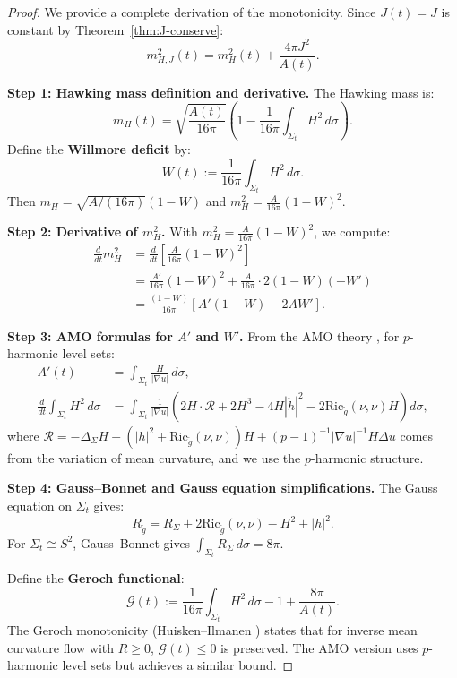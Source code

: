 \documentclass[12pt]{article}
\theoremstyle{plain}
\theoremstyle{definition}
\theoremstyle{remark}
\newcommand{\Ric}{\mathrm{Ric}}
\newcommand{\tg}{\tilde{g}}
\begin{document}
\begin{proof}
We provide a complete derivation of the monotonicity. Since $J(t) = J$ is constant by Theorem~\ref{thm:J-conserve}:
\[
m_{H,J}^2(t) = m_H^2(t) + \frac{4\pi J^2}{A(t)}.
\]

\textbf{Step 1: Hawking mass definition and derivative.}
The Hawking mass is:
\[
m_H(t) = \sqrt{\frac{A(t)}{16\pi}}\left(1 - \frac{1}{16\pi}\int_{\Sigma_t} H^2 \, d\sigma\right).
\]
Define the \textbf{Willmore deficit} by:
\[ W(t) := \frac{1}{16\pi}\int_{\Sigma_t} H^2 \, d\sigma. \]
Then $m_H = \sqrt{A/(16\pi)}(1-W)$ and $m_H^2 = \frac{A}{16\pi}(1 - W)^2$.

\textbf{Step 2: Derivative of $m_H^2$.}
With $m_H^2 = \frac{A}{16\pi}(1-W)^2$, we compute:
\begin{align}
\frac{d}{dt}m_H^2 &= \frac{d}{dt}\left[\frac{A}{16\pi}(1 - W)^2\right] \\
&= \frac{A'}{16\pi}(1 - W)^2 + \frac{A}{16\pi} \cdot 2(1-W)(-W') \\
&= \frac{(1-W)}{16\pi}\left[A'(1 - W) - 2AW'\right].
\end{align}

\textbf{Step 3: AMO formulas for $A'$ and $W'$.}
From the AMO theory \cite[Theorem 3.1]{amo2022}, for $p$-harmonic level sets:
\begin{align}
A'(t) &= \int_{\Sigma_t} \frac{H}{|\nabla u|} \, d\sigma, \label{eq:A-prime}\\
\frac{d}{dt}\int_{\Sigma_t} H^2 \, d\sigma &= \int_{\Sigma_t} \frac{1}{|\nabla u|}\left(2H \cdot \mathcal{R} + 2H^3 - 4H|\mathring{h}|^2 - 2\Ric_{\tg}(\nu,\nu)H\right) d\sigma, \label{eq:H2-prime}
\end{align}
where $\mathcal{R} = -\Delta_\Sigma H - (|h|^2 + \Ric_{\tg}(\nu,\nu))H + (p-1)^{-1}|\nabla u|^{-1}H\Delta u$ comes from the variation of mean curvature, and we use the $p$-harmonic structure.

\textbf{Step 4: Gauss--Bonnet and Gauss equation simplifications.}
The Gauss equation on $\Sigma_t$ gives:
\[
R_{\tg} = R_{\Sigma} + 2\Ric_{\tg}(\nu,\nu) - H^2 + |h|^2.
\]
For $\Sigma_t \cong S^2$, Gauss--Bonnet gives $\int_{\Sigma_t} R_\Sigma \, d\sigma = 8\pi$.

Define the \textbf{Geroch functional}:
\[
\mathcal{G}(t) := \frac{1}{16\pi}\int_{\Sigma_t} H^2 \, d\sigma - 1 + \frac{8\pi}{A(t)}.
\]
The Geroch monotonicity (Huisken--Ilmanen \cite{huisken2001}) states that for inverse mean curvature flow with $R \geq 0$, $\mathcal{G}(t) \leq 0$ is preserved. The AMO version uses $p$-harmonic level sets but achieves a similar bound.


\end{proof}
\end{document}
